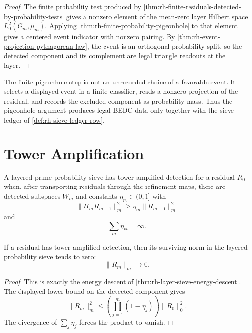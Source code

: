 \begin{proof}
The finite probability test produced by
\autoref{thm:rh-finite-residuals-detected-by-probability-tests} gives a
nonzero element of the mean-zero layer Hilbert space
$L^2_0(G_m,\mu_m)$.  Applying
\autoref{thm:rh-finite-probability-pigeonhole} to that element gives a
centered event indicator with nonzero pairing.  By
\autoref{thm:rh-event-projection-pythagorean-law}, the event is an
orthogonal probability split, so the detected component and its
complement are legal triangle readouts at the layer.
\end{proof}

\begin{principle}
\label{prin:rh-classifier-pigeonhole-ledger-operation}
The finite pigeonhole step is not an unrecorded choice of a favorable
event.  It selects a displayed event in a finite classifier, reads a
nonzero projection of the residual, and records the excluded component
as probability mass.  Thus the pigeonhole argument produces legal
BEDC data only together with the sieve ledger of
\autoref{def:rh-sieve-ledger-row}.
\end{principle}

\section{Tower Amplification}
\label{sec:rh-probability-sieve-tower-amplification}

\begin{definition}
\label{def:rh-tower-amplified-detection}
A layered prime probability sieve has tower-amplified detection for a
residual $R_0$ when, after transporting residuals through the
refinement maps, there are detected subspaces $W_m$ and constants
$\eta_m\in(0,1]$ with
$$
\|\Pi_mR_{m-1}\|_m^2
\ge
\eta_m\|R_{m-1}\|_m^2
$$
and
$$
\sum_m\eta_m=\infty.
$$
\end{definition}

\begin{theorem}
\label{thm:rh-tower-amplification-complete-residual-exhaustion}
If a residual has tower-amplified detection, then its surviving norm in
the layered probability sieve tends to zero:
$$
\|R_m\|_m\to0.
$$
\end{theorem}

\begin{proof}
This is exactly the energy descent of
\autoref{thm:rh-layer-sieve-energy-descent}.  The displayed lower bound
on the detected component gives
$$
\|R_m\|_m^2
\le
\left(\prod_{j=1}^{m}(1-\eta_j)\right)\|R_0\|_0^2.
$$
The divergence of $\sum_j\eta_j$ forces the product to vanish.
\end{proof}

